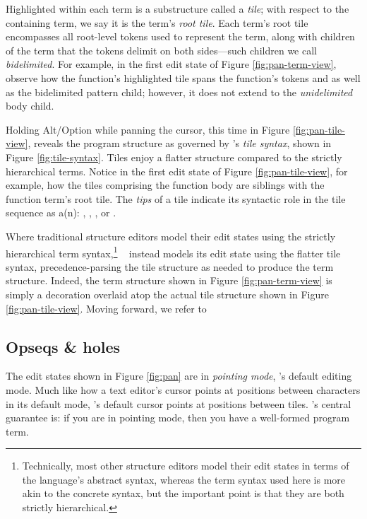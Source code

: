 Highlighted within each term is a substructure called a \emph{tile};
with respect to the containing term, we say it is the term's \emph{root tile}.
Each term's root tile encompasses all root-level tokens used to
represent the term, along with children of the term that the tokens
delimit on both sides---such children we call \emph{bidelimited}.
For example, in the first edit state of
Figure \ref{fig:pan-term-view}, observe how the function's highlighted
tile spans the function's tokens \code{$\boldsymbol{\lambda}$}
and 
as well as the bidelimited pattern child; however, it does not
extend to the \emph{unidelimited} body child.

Holding Alt/Option while panning the cursor, this time in
Figure \ref{fig:pan-tile-view}, reveals the program structure
as governed by \tylr's \emph{tile syntax},
shown in Figure \ref{fig:tile-syntax}.
Tiles enjoy a flatter structure compared to the
strictly hierarchical terms.
Notice in the first edit state of Figure \ref{fig:pan-tile-view},
for example, how the tiles comprising the function body
are siblings with the function term's root tile.
The \emph{tips} of a tile indicate its syntactic
role in the tile sequence as a(n):
, ,
, or .

Where traditional structure editors model their edit states
using the strictly hierarchical term syntax,\footnote{Technically,
most other structure editors model their edit states
in terms of the language's abstract syntax, whereas the
term syntax used here is more akin to the concrete syntax,
but the important point is that they are both strictly hierarchical.}
\tylr~ instead models its edit state using the flatter
tile syntax, precedence-parsing the tile structure
as needed to produce the term structure.
Indeed, the term structure shown in Figure \ref{fig:pan-term-view}
is simply a decoration overlaid atop the actual tile
structure shown in Figure \ref{fig:pan-tile-view}.
Moving forward, we refer to


\subsection{Opseqs \& holes}

The edit states shown in Figure \ref{fig:pan} are in
\emph{pointing mode}, \tylr's default editing mode.
Much like how a text editor's cursor points at positions
between characters in its default mode, \tylr's default
cursor points at positions between tiles.
\tylr's central guarantee is: if you are in pointing mode,
then you have a well-formed program term.

